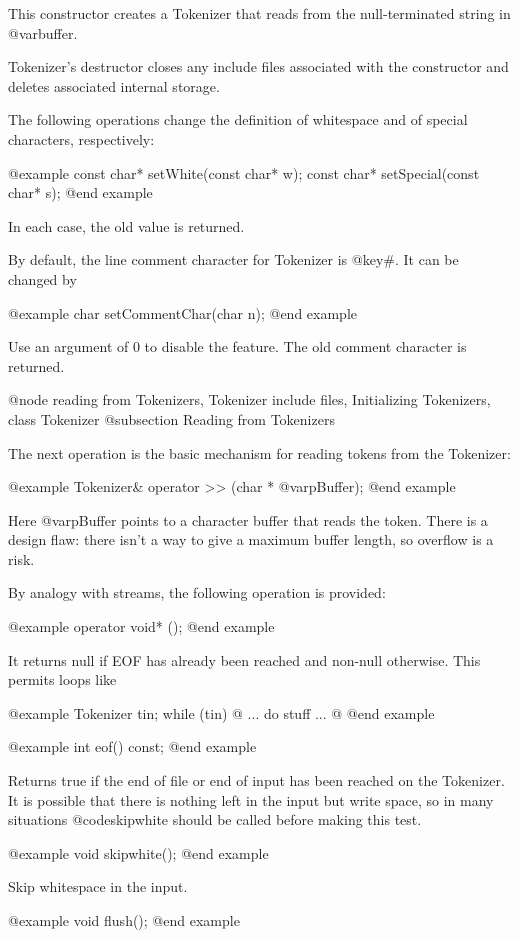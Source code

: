 This constructor creates a Tokenizer that reads from the null-terminated
string in @var{buffer}.

Tokenizer's destructor closes any include files associated with the
constructor and deletes associated internal storage.

The following operations change the definition of whitespace and of
special characters, respectively:

@example
const char* setWhite(const char* w);
const char* setSpecial(const char* s);
@end example

In each case, the old value is returned.

By default, the line comment character for Tokenizer is @key{#}.
It can be changed by

@example
char setCommentChar(char n);
@end example

Use an argument of 0 to disable the feature.  The old comment character
is returned.

@node reading from Tokenizers, Tokenizer include files, Initializing Tokenizers, class Tokenizer
@subsection Reading from Tokenizers

The next operation is the basic mechanism for reading tokens from
the Tokenizer:

@example
Tokenizer& operator >> (char * @var{pBuffer});
@end example

Here @var{pBuffer} points to a character buffer that reads the token.
There is a design flaw: there isn't a way to give a maximum buffer
length, so overflow is a risk.

By analogy with streams, the following operation is provided:

@example
operator void* ();
@end example

It returns null if EOF has already been reached and non-null otherwise.
This permits loops like

@example
Tokenizer tin;
while (tin) @{ ... do stuff ... @}
@end example

@example
int eof() const;
@end example

Returns true if the end of file or end of input has been reached on
the Tokenizer.  It is possible that there is nothing left in the input
but write space, so in many situations @code{skipwhite} should be called
before making this test.

@example
void skipwhite();
@end example

Skip whitespace in the input.

@example
void flush();
@end example

